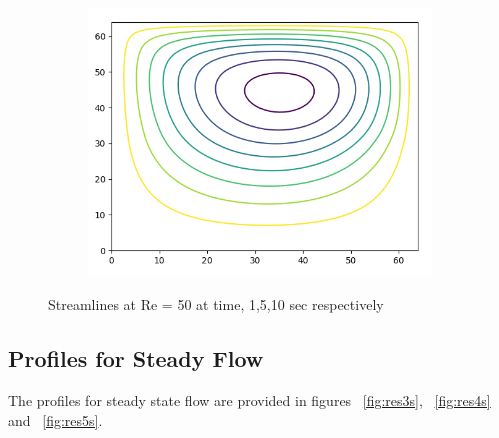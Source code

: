 \documentclass{article}
\begin{document}
\begin{figure}
 \begin{subfigure}[b]{0.5\textwidth}
    \includegraphics[width=\textwidth]{t3.png}
  \end{subfigure}
      \caption{Streamlines at Re = 50 at time, 1,5,10 sec respectively}
\label{fig:res3t}
\end{figure}


\subsection{Profiles for Steady Flow}
The profiles for steady state flow are provided in figures  ~\ref{fig:res3s}, ~\ref{fig:res4s} and ~\ref{fig:res5s}.
\end{document}
